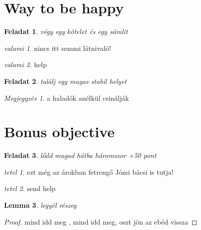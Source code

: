 \documentclass{article}
\theoremstyle{remark}
\newtheorem{tet}{tetel}
\newtheorem{defin}{valami}
\newtheorem*{megjegyzés}{Megjegyzés}
\theoremstyle{plain}
\newtheorem{lemma}[defin]{Lemma}
\newtheorem{feladat}{Feladat}
\begin{document}
\pagebreak
\section{Way to be happy}
\begin{feladat}
végy egy kötelet és egy sámlit
\end{feladat}
\begin{defin}
nincs itt semmi látnivaló!
\end{defin}
\begin{defin}
help
\end{defin}
\begin{feladat}
találj egy magas stabil helyet
\end{feladat}
\begin{megjegyzés}
a haladók anélkül csinálják
\end{megjegyzés}
\section{Bonus objective}
\begin{feladat}
lődd magad hátba háromszor +50 pont
\end{feladat}
\begin{tet}
ezt még az árokban fetrengő Józsi bácsi is tutja!
\end{tet}
\begin{tet}
send help
\end{tet}
\begin{lemma}
legyél részeg
\end{lemma}
\begin{proof}
mind idd meg , mind idd meg, oszt jön az ebéd vissza
\end{proof}
\end{document}
